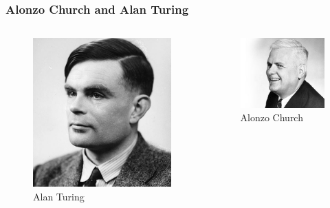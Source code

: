 \documentclass{beamer}
\begin{document}
\begin{frame}
  \frametitle{Alonzo Church and Alan Turing}
  \begin{columns}
    \begin{column}{0.5\textwidth}
      \begin{center}
        \begin{figure}
          \includegraphics[width=.45\paperwidth]{images/turing.png}
          \caption{Alan Turing}
        \end{figure}
      \end{center}
    \end{column}
    \begin{column}{0.5\textwidth}
      \begin{center}
        \begin{figure}
          \includegraphics[width=.45\paperwidth]{images/church.jpg}
          \caption{Alonzo Church}
        \end{figure}
      \end{center}
    \end{column}
  \end{columns}
\end{frame}
\end{document}
